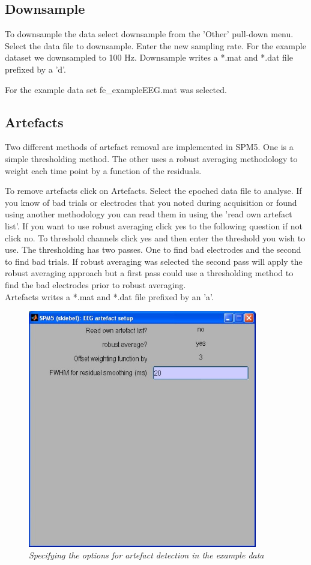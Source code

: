 \subsection{Downsample}
To downsample the data select downsample from the 'Other' pull-down
menu. Select the data file to downsample. Enter the new sampling
rate. For the example dataset we downsampled to 100 Hz. Downsample
writes a *.mat and *.dat file prefixed by a 'd'.

For the example data set fe\_exampleEEG.mat was selected.

\subsection{Artefacts}
Two different methods of artefact removal are implemented in SPM5. One
is a simple thresholding method. The other uses a robust averaging
methodology to weight each time point by a function of the residuals. 

To remove artefacts click on Artefacts. Select the epoched data file
to analyse. If you know of bad trials or electrodes that you noted
during acquisition or found using another methodology you can read
them in using the 'read own artefact list'. If you want to use robust
averaging click yes to the following question if not click no. To
threshold channels click yes and then enter the threshold you wish to
use. The thresholding has two passes. One to find bad electrodes and
the second to find bad trials. If robust averaging was selected the
second pass will apply the robust averaging approach but a first pass
could use a thresholding method to find the bad electrodes prior to
robust averaging.\\

Artefacts writes a *.mat and *.dat file prefixed by an 'a'.\\ 

\begin{figure}
\begin{center}
\includegraphics[width=100mm]{meeg/tutorial3}
\end{center}
\caption{\em Specifying the options for artefact detection in the
  example data}
\end{figure}

